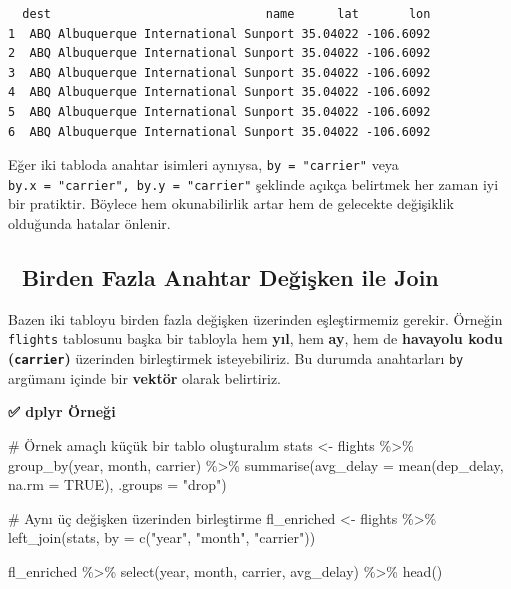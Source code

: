 \documentclass[
  letterpaper,
  DIV=11,
  numbers=noendperiod]{scrreprt}
\newenvironment{Shaded}{\begin{snugshade}}{\end{snugshade}}
\newcommand{\AttributeTok}[1]{\textcolor[rgb]{0.40,0.45,0.13}{#1}}
\newcommand{\CommentTok}[1]{\textcolor[rgb]{0.37,0.37,0.37}{#1}}
\newcommand{\ConstantTok}[1]{\textcolor[rgb]{0.56,0.35,0.01}{#1}}
\newcommand{\FunctionTok}[1]{\textcolor[rgb]{0.28,0.35,0.67}{#1}}
\newcommand{\NormalTok}[1]{\textcolor[rgb]{0.00,0.23,0.31}{#1}}
\newcommand{\OtherTok}[1]{\textcolor[rgb]{0.00,0.23,0.31}{#1}}
\newcommand{\SpecialCharTok}[1]{\textcolor[rgb]{0.37,0.37,0.37}{#1}}
\newcommand{\StringTok}[1]{\textcolor[rgb]{0.13,0.47,0.30}{#1}}
\begin{document}
\begin{verbatim}
  dest                              name      lat       lon
1  ABQ Albuquerque International Sunport 35.04022 -106.6092
2  ABQ Albuquerque International Sunport 35.04022 -106.6092
3  ABQ Albuquerque International Sunport 35.04022 -106.6092
4  ABQ Albuquerque International Sunport 35.04022 -106.6092
5  ABQ Albuquerque International Sunport 35.04022 -106.6092
6  ABQ Albuquerque International Sunport 35.04022 -106.6092
\end{verbatim}

Eğer iki tabloda anahtar isimleri aynıysa, \texttt{by\ =\ "carrier"}
veya \texttt{by.x\ =\ "carrier",\ by.y\ =\ "carrier"} şeklinde açıkça
belirtmek her zaman iyi bir pratiktir. Böylece hem okunabilirlik artar
hem de gelecekte değişiklik olduğunda hatalar önlenir.

\subsection*{🧩 Birden Fazla Anahtar Değişken ile
Join}\label{birden-fazla-anahtar-deux11fiux15fken-ile-join}

Bazen iki tabloyu birden fazla değişken üzerinden eşleştirmemiz gerekir.
Örneğin \texttt{flights} tablosunu başka bir tabloyla hem \textbf{yıl},
hem \textbf{ay}, hem de \textbf{havayolu kodu (\texttt{carrier})}
üzerinden birleştirmek isteyebiliriz. Bu durumda anahtarları \texttt{by}
argümanı içinde bir \textbf{vektör} olarak belirtiriz.

\textbf{✅ dplyr Örneği}

\begin{Shaded}
\begin{Highlighting}[]
\CommentTok{\# Örnek amaçlı küçük bir tablo oluşturalım}
\NormalTok{stats }\OtherTok{\textless{}{-}}\NormalTok{ flights }\SpecialCharTok{\%\textgreater{}\%}
  \FunctionTok{group\_by}\NormalTok{(year, month, carrier) }\SpecialCharTok{\%\textgreater{}\%}
  \FunctionTok{summarise}\NormalTok{(}\AttributeTok{avg\_delay =} \FunctionTok{mean}\NormalTok{(dep\_delay, }\AttributeTok{na.rm =} \ConstantTok{TRUE}\NormalTok{), }\AttributeTok{.groups =} \StringTok{"drop"}\NormalTok{)}

\CommentTok{\# Aynı üç değişken üzerinden birleştirme}
\NormalTok{fl\_enriched }\OtherTok{\textless{}{-}}\NormalTok{ flights }\SpecialCharTok{\%\textgreater{}\%}
  \FunctionTok{left\_join}\NormalTok{(stats, }\AttributeTok{by =} \FunctionTok{c}\NormalTok{(}\StringTok{"year"}\NormalTok{, }\StringTok{"month"}\NormalTok{, }\StringTok{"carrier"}\NormalTok{))}

\NormalTok{fl\_enriched }\SpecialCharTok{\%\textgreater{}\%} \FunctionTok{select}\NormalTok{(year, month, carrier, avg\_delay) }\SpecialCharTok{\%\textgreater{}\%} \FunctionTok{head}\NormalTok{()}
\end{Highlighting}
\end{Shaded}
\end{document}
